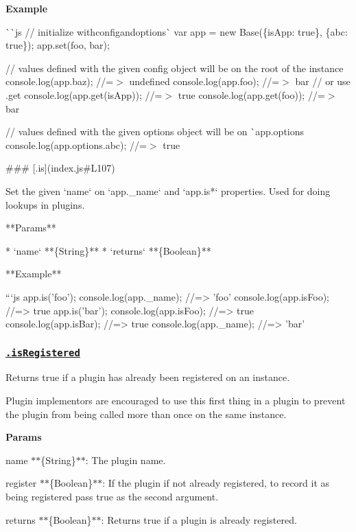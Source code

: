 {\bfseries Example}

\`{}\`{}{\ttfamily js // initialize with}config{\ttfamily and}options\`{} var app = new Base(\{is\+App\+: true\}, \{abc\+: true\}); app.\+set(\textquotesingle{}foo\textquotesingle{}, \textquotesingle{}bar\textquotesingle{});

// values defined with the given {\ttfamily config} object will be on the root of the instance console.\+log(app.\+baz); //=$>$ undefined console.\+log(app.\+foo); //=$>$ \textquotesingle{}bar\textquotesingle{} // or use {\ttfamily .get} console.\+log(app.\+get(\textquotesingle{}is\+App\textquotesingle{})); //=$>$ true console.\+log(app.\+get(\textquotesingle{}foo\textquotesingle{})); //=$>$ \textquotesingle{}bar\textquotesingle{}

// values defined with the given {\ttfamily options} object will be on \`{}app.options console.\+log(app.\+options.\+abc); //=$>$ true 
\begin{DoxyCode}
### [.is](index.js#L107)

Set the given `name` on `app.\_name` and `app.is*` properties. Used for doing lookups in plugins.

**Params**

* `name` **\{String\}**
* `returns` **\{Boolean\}**

**Example**

```js
app.is('foo');
console.log(app.\_name);
//=> 'foo'
console.log(app.isFoo);
//=> true
app.is('bar');
console.log(app.isFoo);
//=> true
console.log(app.isBar);
//=> true
console.log(app.\_name);
//=> 'bar'
\end{DoxyCode}


\subsubsection*{\href{index.js#L145}{\tt .is\+Registered}}

Returns true if a plugin has already been registered on an instance.

Plugin implementors are encouraged to use this first thing in a plugin to prevent the plugin from being called more than once on the same instance.

{\bfseries Params}


\begin{DoxyItemize}
\item {\ttfamily name} $\ast$$\ast$\{String\}$\ast$$\ast$\+: The plugin name.
\item {\ttfamily register} $\ast$$\ast$\{Boolean\}$\ast$$\ast$\+: If the plugin if not already registered, to record it as being registered pass {\ttfamily true} as the second argument.
\item {\ttfamily returns} $\ast$$\ast$\{Boolean\}$\ast$$\ast$\+: Returns true if a plugin is already registered.
\end{DoxyItemize}

